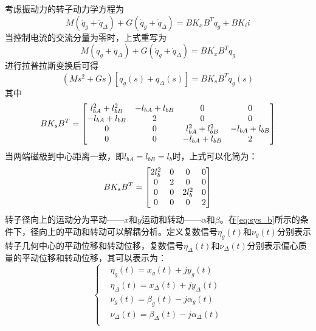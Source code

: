 考虑振动力的转子动力学方程为
\begin{equation}
M\left( {{{\ddot q}_g} + {{{\ddot q}}_\Delta }} \right) + G\left( {{{\dot q}_{g}} + {{{\dot q}}_\Delta }} \right) = {B}{K_x}{{B}^{T}}{{q}_g} + {B}{{K}_{i}}{i}
\end{equation}
当控制电流的交流分量为零时，上式重写为
\begin{equation}
M\left( {{{\ddot q}_g} + {{{\ddot q}}_\Delta }} \right) + G\left( {{{\dot q}_{g}} + {{{\dot q}}_\Delta }} \right) = {B}{K_x}{{B}^{T}}{{q}_g}
\end{equation}
进行拉普拉斯变换后可得
\begin{equation}
\left( {M{s^2} + Gs} \right)\left[ {{q_g}\left( s \right) + {q_\Delta }\left( s \right)} \right] =  B{{K}_{s}}{{B}^{T}}{{q}_g}\left( s \right)
\end{equation}
其中
\begin{equation}
{B}{K_s}{{B}^{T}} = \left[ {\begin{matrix}
   {l_{bA}^2 + l_{bB}^2} & { - {l_{bA}} + {l_{bB}}} & 0 & 0  \cr 
   { - {l_{bA}} + {l_{bB}}} & 2 & 0 & 0  \cr 
   0 & 0 & {l_{bA}^2 + l_{bB}^2} & { - {l_{bA}} + {l_{bB}}}  \cr 
   0 & 0 & { - {l_{bA}} + {l_{bB}}} & 2  \cr 
 \end{matrix} } \right]
\end{equation}
当两端磁极到中心距离一致，即${l_{bA}} = {l_{bB}} = {l_b}$时，上式可以化简为：
\begin{equation}
\label{eq:sys_b}
{B}{K_s}{{B}^{T}} = \left[ {\begin{matrix}
   {2l_b^2} & 0 & 0 & 0  \cr 
   0 & 2 & 0 & 0  \cr 
   0 & 0 & {2l_b^2} & 0  \cr 
   0 & 0 & 0 & 2  \cr 

 \end{matrix} } \right]
\end{equation}
转子径向上的运动分为平动——$x$和$y$运动和转动——$\alpha$和$\beta$。在\autoref{eq:sys_b}所示的条件下，径向上的平动和转动可以解耦分析。定义复数信号$\eta _g(t)$和$\nu _g(t)$分别表示转子几何中心的平动位移和转动位移，复数信号$\eta _{\Delta}(t)$和$\nu _{\Delta}(t)$分别表示偏心质量的平动位移和转动位移，其可以表示为：
\begin{equation}
\label{eq:decouple_define}
\left\{
\begin{aligned}
& \eta _g(t) = x_g(t) + jy_g(t)\\
& \eta _{\Delta}(t) = x_{\Delta}(t) + jy_{\Delta}(t)\\
& \nu _g(t) = {\beta}_g(t) - j{\alpha}_g(t)\\
& \nu _{\Delta}(t) = {\beta}_{\Delta}(t) - j{\alpha}_{\Delta}(t)\\
\end{aligned}
\right.
\end{equation}
